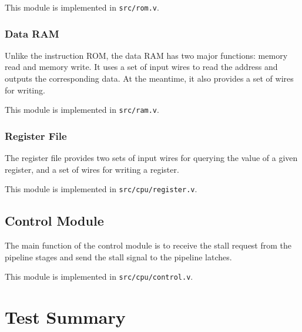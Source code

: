 \documentclass{article}
\begin{document}
This module is implemented in \texttt{src/rom.v}.

\subsubsection{Data RAM}
Unlike the instruction ROM, the data RAM has two major functions: memory read and memory write. It uses a set of input wires to read the address and outputs the corresponding data. At the meantime, it also provides a set of wires for writing.

This module is implemented in \texttt{src/ram.v}.

\subsubsection{Register File}
The register file provides two sets of input wires for querying the value of a given register, and a set of wires for writing a register.

This module is implemented in \texttt{src/cpu/register.v}.

\subsection{Control Module}
The main function of the control module is to receive the stall request from the pipeline stages and send the stall signal to the pipeline latches.

This module is implemented in \texttt{src/cpu/control.v}.

%
%

\section{Test Summary}
\end{document}
